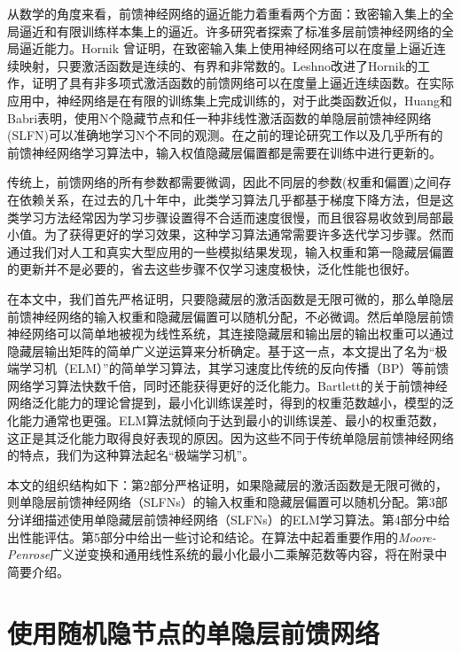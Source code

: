 \documentclass[conference]{IEEEtran}
\begin{document}
从数学的角度来看，前馈神经网络的逼近能力着重看两个方面：致密输入集上的全局逼近和有限训练样本集上的逼近。许多研究者探索了标准多层前馈神经网络的全局逼近能力。Hornik 曾证明，在致密输入集上使用神经网络可以在度量上逼近连续映射，只要激活函数是连续的、有界和非常数的。Leshno改进了Hornik的工作，证明了具有非多项式激活函数的前馈网络可以在度量上逼近连续函数。在实际应用中，神经网络是在有限的训练集上完成训练的，对于此类函数近似，Huang和Babri表明，使用N个隐藏节点和任一种非线性激活函数的单隐层前馈神经网络(SLFN)可以准确地学习N个不同的观测。在之前的理论研究工作以及几乎所有的前馈神经网络学习算法中，输入权值隐藏层偏置都是需要在训练中进行更新的。

传统上，前馈网络的所有参数都需要微调，因此不同层的参数(权重和偏置)之间存在依赖关系，在过去的几十年中，此类学习算法几乎都基于梯度下降方法，但是这类学习方法经常因为学习步骤设置得不合适而速度很慢，而且很容易收敛到局部最小值。为了获得更好的学习效果，这种学习算法通常需要许多迭代学习步骤。然而通过我们对人工和真实大型应用的一些模拟结果发现，输入权重和第一隐藏层偏置的更新并不是必要的，省去这些步骤不仅学习速度极快，泛化性能也很好。

在本文中，我们首先严格证明，只要隐藏层的激活函数是无限可微的，那么单隐层前馈神经网络的输入权重和隐藏层偏置可以随机分配，不必微调。然后单隐层前馈神经网络可以简单地被视为线性系统，其连接隐藏层和输出层的输出权重可以通过隐藏层输出矩阵的简单广义逆运算来分析确定。基于这一点，本文提出了名为“极端学习机（ELM）”的简单学习算法，其学习速度比传统的反向传播（BP）等前馈网络学习算法快数千倍，同时还能获得更好的泛化能力。Bartlett的关于前馈神经网络泛化能力的理论曾提到，最小化训练误差时，得到的权重范数越小，模型的泛化能力通常也更强。ELM算法就倾向于达到最小的训练误差、最小的权重范数，这正是其泛化能力取得良好表现的原因。因为这些不同于传统单隐层前馈神经网络的特点，我们为这种算法起名“极端学习机”。

本文的组织结构如下：第2部分严格证明，如果隐藏层的激活函数是无限可微的，则单隐层前馈神经网络（SLFNs）的输入权重和隐藏层偏置可以随机分配。第3部分详细描述使用单隐藏层前馈神经网络（SLFNs）的ELM学习算法。第4部分中给出性能评估。第5部分中给出一些讨论和结论。在算法中起着重要作用的\textit{Moore-Penrose}广义逆变换和通用线性系统的最小化最小二乘解范数等内容，将在附录中简要介绍。


\section{使用随机隐节点的单隐层前馈网络}
\end{document}
